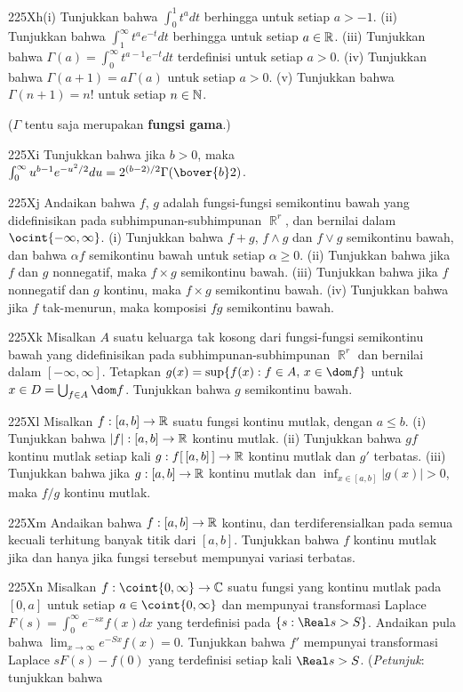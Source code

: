{\spheader 225Xh(i) Tunjukkan bahwa $\int_0^1t^adt$ berhingga untuk
setiap $a>-1$.   (ii) Tunjukkan bahwa $\int_1^{\infty}t^ae^{-t}dt$ berhingga
untuk setiap $a\in\Bbb R$.      (iii) Tunjukkan bahwa
$\Gamma(a)=\int_0^{\infty}t^{a-1}e^{-t}dt$ terdefinisi untuk setiap $a>0$.
(iv) Tunjukkan bahwa $\Gamma(a+1)=a\Gamma(a)$ untuk setiap $a>0$.   (v) Tunjukkan bahwa
$\Gamma(n+1)=n!$ untuk setiap $n\in\Bbb N$.

($\Gamma$ tentu saja merupakan {\bf fungsi gama}.)

\spheader 225Xi Tunjukkan bahwa jika $b>0$, maka
$\int_0^{\infty}u^{b-1}e^{-u^2/2}du=2^{(b-2)/2}\Gamma(\bover{b}2)$.

\spheader 225Xj Andaikan bahwa $f$, $g$ adalah
fungsi-fungsi semikontinu bawah yang didefinisikan pada subhimpunan-subhimpunan $\BbbR^r$,
dan bernilai dalam $\ocint{-\infty,\infty}$.   (i) Tunjukkan bahwa $f+g$,
$f\wedge g$ dan $f\vee g$ semikontinu bawah, dan bahwa
$\alpha f$ semikontinu
bawah untuk setiap $\alpha\ge 0$.   (ii) Tunjukkan bahwa jika $f$ dan $g$
nonnegatif, maka $f\times g$ semikontinu bawah.
(iii) Tunjukkan bahwa jika $f$ nonnegatif dan $g$ kontinu, maka
$f\times g$ semikontinu bawah.   (iv) Tunjukkan bahwa jika $f$
tak-menurun, maka komposisi $fg$ semikontinu bawah.

\spheader 225Xk Misalkan $A$ suatu keluarga tak kosong dari fungsi-fungsi
semikontinu bawah yang didefinisikan pada subhimpunan-subhimpunan $\BbbR^r$ dan bernilai
dalam $[-\infty,\infty]$.   Tetapkan $g(x)=\sup\{f(x):f\in A,\,x\in\dom
f\}$ untuk $x\in
D=\bigcup_{f\in A}\dom f$.   Tunjukkan bahwa $g$ semikontinu
bawah.

\spheader 225Xl Misalkan $f:[a,b]\to\Bbb R$ suatu fungsi kontinu mutlak,
dengan $a\le b$.   (i) Tunjukkan bahwa $|f|:[a,b]\to\Bbb R$ kontinu
mutlak.   (ii) Tunjukkan bahwa $gf$ kontinu mutlak
setiap kali $g:f[\,[a,b]\,]\to\Bbb R$ kontinu mutlak dan
$g'$ terbatas.   (iii) Tunjukkan bahwa jika $g:[a,b]\to\Bbb R$ kontinu
mutlak dan $\inf_{x\in[a,b]}|g(x)|>0$, maka
$f/g$ kontinu mutlak.

\spheader 225Xm Andaikan bahwa $f:[a,b]\to\Bbb R$ kontinu, dan
terdiferensialkan pada semua kecuali terhitung banyak
titik dari $[a,b]$. Tunjukkan bahwa $f$ kontinu mutlak jika dan hanya jika
fungsi tersebut mempunyai variasi terbatas.

\spheader 225Xn Misalkan $f:\coint{0,\infty}\to\Bbb C$ suatu fungsi
yang kontinu mutlak pada $[0,a]$ untuk setiap
$a\in\coint{0,\infty}$ dan mempunyai transformasi Laplace
$F(s)=\int_0^{\infty}e^{-sx}f(x)dx$ yang terdefinisi pada $\{s:\Real s>S\}$.
Andaikan pula bahwa $\lim_{x\to\infty}e^{-Sx}f(x)=0$.   Tunjukkan
bahwa $f'$ mempunyai transformasi Laplace $sF(s)-f(0)$ yang terdefinisi setiap kali $\Real
s>S$.   ({\it Petunjuk\/}:  tunjukkan bahwa

}
